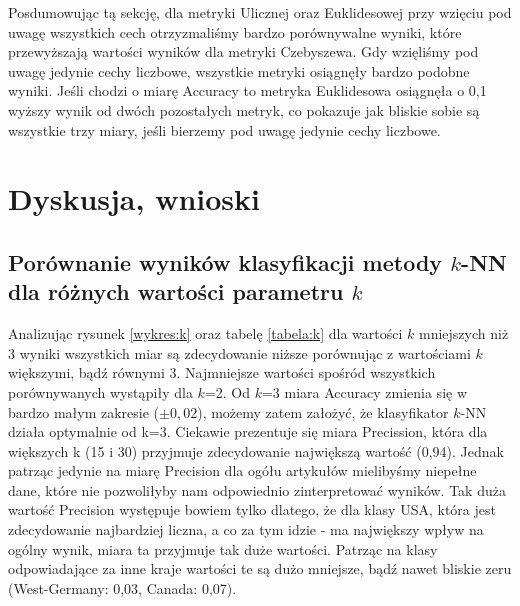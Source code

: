 \documentclass{classrep}
\begin{document}
\indent Posdumowując tą sekcję, dla metryki Ulicznej oraz Euklidesowej przy wzięciu pod uwagę wszystkich cech otrzyzmaliśmy bardzo porównywalne wyniki, które przewyższają wartości wyników dla metryki Czebyszewa. Gdy wzięliśmy pod uwagę jedynie cechy liczbowe, wszystkie metryki osiągnęły bardzo podobne wyniki. Jeśli chodzi o miarę Accuracy to metryka Euklidesowa osiągnęła o 0,1 wyższy wynik od dwóch pozostałych metryk, co pokazuje jak bliskie sobie są wszystkie trzy miary, jeśli bierzemy pod uwagę jedynie cechy liczbowe.


\clearpage
\section{Dyskusja, wnioski}
\subsection{Porównanie wyników klasyfikacji metody $k$-NN dla różnych wartości parametru $k$}

Analizując rysunek \ref{wykres:k} oraz tabelę \ref{tabela:k} dla wartości $k$ mniejszych niż 3 wyniki wszystkich miar są zdecydowanie niższe porównując z wartościami $k$ większymi, bądź równymi 3. Najmniejsze wartości spośród wszystkich porównywanych wystąpiły dla $k$=2. Od $k$=3 miara Accuracy zmienia się w bardzo małym zakresie ($\pm 0,02$), możemy zatem założyć, że klasyfikator $k$-NN działa optymalnie od k=3. Ciekawie prezentuje się miara Precission, która dla większych k (15 i 30) przyjmuje zdecydowanie największą wartość (0,94). Jednak patrząc jedynie na miarę Precision dla ogółu artykułów mielibyśmy niepełne dane, które nie pozwoliłyby nam odpowiednio zinterpretować wyników. Tak duża wartość Precision występuje bowiem tylko dlatego, że dla klasy USA, która jest zdecydowanie najbardziej liczna, a co za tym idzie - ma największy wpływ na ogólny wynik, miara ta przyjmuje tak duże wartości. Patrząc na klasy odpowiadające za inne kraje wartości te są dużo mniejsze, bądź nawet bliskie zeru (West-Germany: 0,03, Canada: 0,07).
\end{document}
